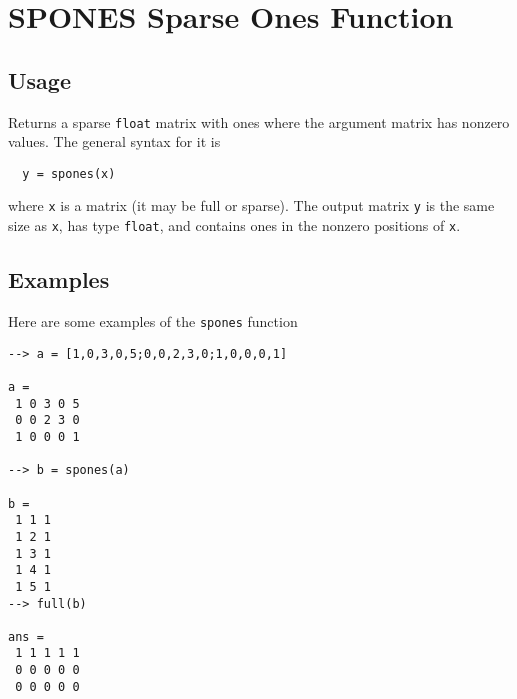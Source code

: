 \section{SPONES Sparse Ones Function}

\subsection{Usage}

Returns a sparse \verb|float| matrix with ones where the argument
matrix has nonzero values.  The general syntax for it is
\begin{verbatim}
  y = spones(x)
\end{verbatim}
where \verb|x| is a matrix (it may be full or sparse).  The output
matrix \verb|y| is the same size as \verb|x|, has type \verb|float|, and contains
ones in the nonzero positions of \verb|x|.
\subsection{Examples}

Here are some examples of the \verb|spones| function
\begin{verbatim}
--> a = [1,0,3,0,5;0,0,2,3,0;1,0,0,0,1]

a = 
 1 0 3 0 5 
 0 0 2 3 0 
 1 0 0 0 1 

--> b = spones(a)

b = 
 1 1 1
 1 2 1
 1 3 1
 1 4 1
 1 5 1
--> full(b)

ans = 
 1 1 1 1 1 
 0 0 0 0 0 
 0 0 0 0 0 
\end{verbatim}
